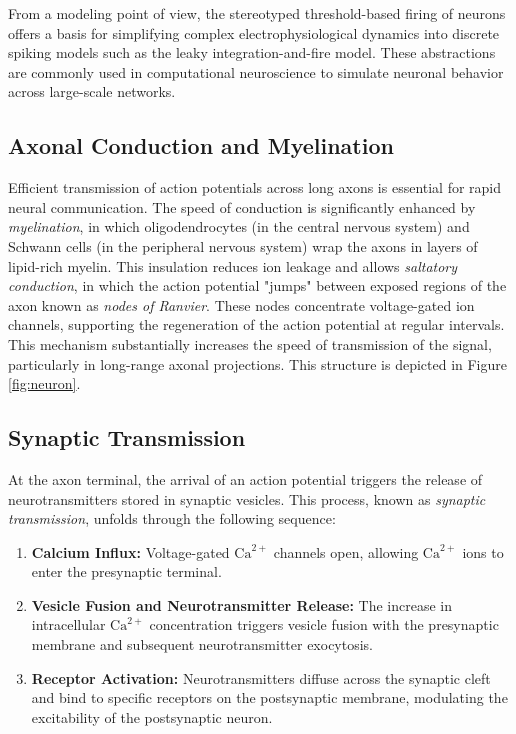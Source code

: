 From a modeling point of view, the stereotyped threshold-based firing of neurons offers a basis for simplifying complex electrophysiological dynamics into discrete spiking models such as the leaky integration-and-fire model. These abstractions are commonly used in computational neuroscience to simulate neuronal behavior across large-scale networks.

\subsection{Axonal Conduction and Myelination}
\label{subsec:axonal_conduction}

Efficient transmission of action potentials across long axons is essential for rapid neural communication. The speed of conduction is significantly enhanced by \emph{myelination}, in which oligodendrocytes (in the central nervous system) and Schwann cells (in the peripheral nervous system) wrap the axons in layers of lipid-rich myelin. This insulation reduces ion leakage and allows \emph{saltatory conduction}, in which the action potential "jumps" between exposed regions of the axon known as \emph{nodes of Ranvier}. These nodes concentrate voltage-gated ion channels, supporting the regeneration of the action potential at regular intervals. This mechanism substantially increases the speed of transmission of the signal, particularly in long-range axonal projections. This structure is depicted in Figure \ref{fig:neuron}.

\subsection{Synaptic Transmission}
\label{subsec:synaptic_transmission}

At the axon terminal, the arrival of an action potential triggers the release of neurotransmitters stored in synaptic vesicles. This process, known as \emph{synaptic transmission}, unfolds through the following sequence:

\begin{enumerate}
    \item \textbf{Calcium Influx:} Voltage-gated $\text{Ca}^{2+}$ channels open, allowing $\text{Ca}^{2+}$ ions to enter the presynaptic terminal.
    \item \textbf{Vesicle Fusion and Neurotransmitter Release:} The increase in intracellular $\text{Ca}^{2+}$ concentration triggers vesicle fusion with the presynaptic membrane and subsequent neurotransmitter exocytosis.
    \item \textbf{Receptor Activation:} Neurotransmitters diffuse across the synaptic cleft and bind to specific receptors on the postsynaptic membrane, modulating the excitability of the postsynaptic neuron.
\end{enumerate}

